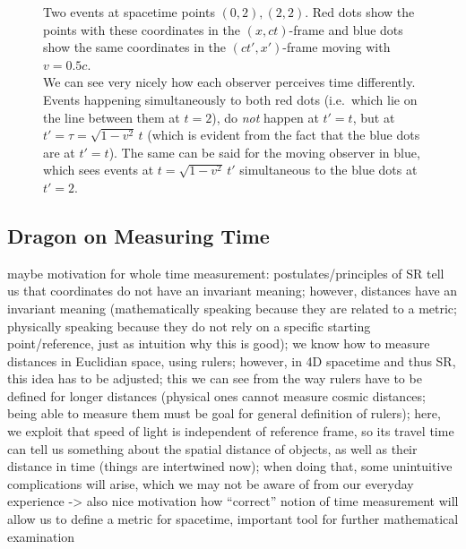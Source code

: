 \begin{figure}
\centering


\caption{Two events at spacetime points $(0,2), (2,2)$. Red dots show the points with these coordinates in the $(x, ct)$-frame and blue dots show the same coordinates in the $(ct', x')$-frame moving with $v = 0.5 c$.\\
We can see very nicely how each observer perceives time differently. Events happening simultaneously to both red dots (i.e.~which lie on the line between them at $t = 2$), do \emph{not} happen at $t' = t$, but at $t' = \tau = \sqrt{1 - v^2} \, t$ (which is evident from the fact that the blue dots are at $t' = t$). The same can be said for the moving observer in blue, which sees events at $t = \sqrt{1 - v^2} \, t'$ simultaneous to the blue dots at $t' = 2$.}
\end{figure}



		\subsection{Dragon on Measuring Time}
maybe motivation for whole time measurement: postulates/principles of SR tell us that coordinates do not have an invariant meaning; however, distances have an invariant meaning (mathematically speaking because they are related to a metric; physically speaking because they do not rely on a specific starting point/reference, just as intuition why this is good); we know how to measure distances in Euclidian space, using rulers; however, in 4D spacetime and thus SR, this idea has to be adjusted; this we can see from the way rulers have to be defined for longer distances (physical ones cannot measure cosmic distances; being able to measure them must be goal for general definition of rulers); here, we exploit that speed of light is independent of reference frame, so its travel time can tell us something about the spatial distance of objects, as well as their distance in time (things are intertwined now); when doing that, some unintuitive complications will arise, which we may not be aware of from our everyday experience -> also nice motivation how \enquote{correct} notion of time measurement will allow us to define a metric for spacetime, important tool for further mathematical examination



